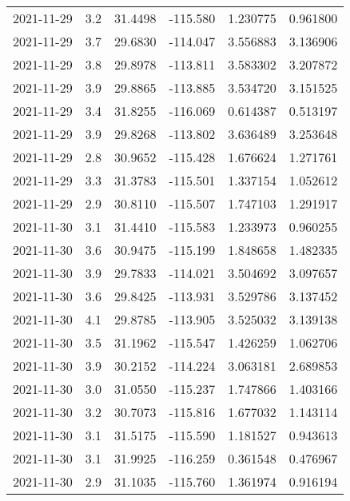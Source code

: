 \begin{tabular}{lrrrrr}
2021-11-29 &       3.2 &  31.4498 &  -115.580 &         1.230775 &         0.961800 \\
2021-11-29 &       3.7 &  29.6830 &  -114.047 &         3.556883 &         3.136906 \\
2021-11-29 &       3.8 &  29.8978 &  -113.811 &         3.583302 &         3.207872 \\
2021-11-29 &       3.9 &  29.8865 &  -113.885 &         3.534720 &         3.151525 \\
2021-11-29 &       3.4 &  31.8255 &  -116.069 &         0.614387 &         0.513197 \\
2021-11-29 &       3.9 &  29.8268 &  -113.802 &         3.636489 &         3.253648 \\
2021-11-29 &       2.8 &  30.9652 &  -115.428 &         1.676624 &         1.271761 \\
2021-11-29 &       3.3 &  31.3783 &  -115.501 &         1.337154 &         1.052612 \\
2021-11-29 &       2.9 &  30.8110 &  -115.507 &         1.747103 &         1.291917 \\
2021-11-30 &       3.1 &  31.4410 &  -115.583 &         1.233973 &         0.960255 \\
2021-11-30 &       3.6 &  30.9475 &  -115.199 &         1.848658 &         1.482335 \\
2021-11-30 &       3.9 &  29.7833 &  -114.021 &         3.504692 &         3.097657 \\
2021-11-30 &       3.6 &  29.8425 &  -113.931 &         3.529786 &         3.137452 \\
2021-11-30 &       4.1 &  29.8785 &  -113.905 &         3.525032 &         3.139138 \\
2021-11-30 &       3.5 &  31.1962 &  -115.547 &         1.426259 &         1.062706 \\
2021-11-30 &       3.9 &  30.2152 &  -114.224 &         3.063181 &         2.689853 \\
2021-11-30 &       3.0 &  31.0550 &  -115.237 &         1.747866 &         1.403166 \\
2021-11-30 &       3.2 &  30.7073 &  -115.816 &         1.677032 &         1.143114 \\
2021-11-30 &       3.1 &  31.5175 &  -115.590 &         1.181527 &         0.943613 \\
2021-11-30 &       3.1 &  31.9925 &  -116.259 &         0.361548 &         0.476967 \\
2021-11-30 &       2.9 &  31.1035 &  -115.760 &         1.361974 &         0.916194 \\

\end{tabular}
